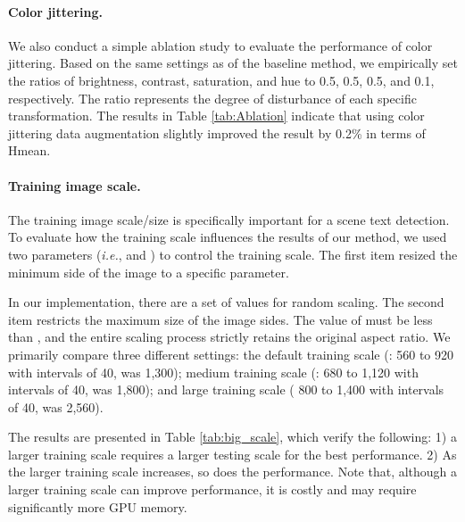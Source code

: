 \paragraph{Color jittering.} We also conduct a simple ablation study to evaluate the performance of color jittering. Based on the same settings as of the baseline method, we empirically set the ratios of brightness, contrast, saturation, and hue to 0.5, 0.5, 0.5, and 0.1, respectively. The ratio represents the degree of disturbance of each specific transformation. The results in Table \ref{tab:Ablation} indicate that using color jittering data augmentation slightly improved the result by 0.2\% in terms of Hmean.



\paragraph{Training image scale.} The training image scale/size is specifically important for a scene text detection. To evaluate how the training scale influences the results of our method, we used two parameters (\textit{i.e.},  and ) to control the training scale. The first item resized the minimum side of the image to a specific parameter. 

In our implementation, there are a set of values for random scaling. The second item restricts the maximum size of the image sides. The value of  must be less than , and the entire scaling process strictly retains the original aspect ratio. We primarily compare three different settings: the default training scale (: 560 to 920 with intervals of 40,  was 1,300); medium training scale (: 680 to 1,120 with intervals of 40,  was 1,800); and large training scale ( 800 to 1,400 with intervals of 40,  was 2,560). 

The results are presented in Table \ref{tab:big_scale}, which verify the following: 1) a larger training scale requires a larger testing scale for the best performance. 2) As the larger training scale increases, so does the performance. Note that, although a larger training scale can improve performance, it is costly and may require significantly more GPU memory.

